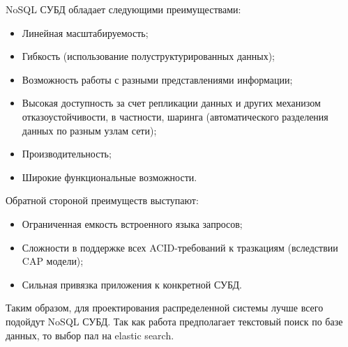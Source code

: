 NoSQL СУБД обладает следующими преимуществами:
\begin{itemize}
    \item Линейная масштабируемость;
    \item Гибкость (использование полуструктурированных данных);
    \item Возможность работы с разными представлениями информации;
    \item Высокая доступность за счет репликации данных и других механизом
        отказоустойчивости, в частности, шаринга (автоматического разделения
        данных по разным узлам сети);
    \item Производительность;
    \item Широкие функциональные возможности.
\end{itemize}

Обратной стороной преимуществ выступают:
\begin{itemize}
    \item Ограниченная емкость встроенного языка запросов;
    \item Сложности в поддержке всех ACID-требований к тразкациям (вследствии
        CAP модели);
    \item Сильная привязка приложения к конкретной СУБД.
\end{itemize}

Таким образом, для проектирования распределенной системы лучше всего подойдут
NoSQL СУБД. Так как работа предполагает текстовый поиск по базе данных, то выбор
пал на elastic search.

